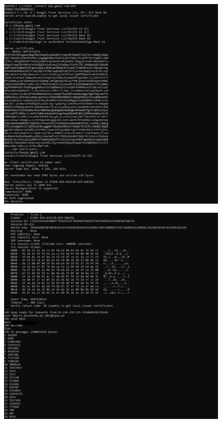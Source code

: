 \documentclass{article}
\begin{document}
\begin{normalsize}
\begin{figure}[H]
\end{figure}

\begin{figure}[H]
	\centering
	\includegraphics[width=\textwidth]{21}
\end{figure}
\begin{figure}[H]
	\centering
	\includegraphics[width=\textwidth]{22}

\end{figure}
\end{normalsize}
\end{document}
